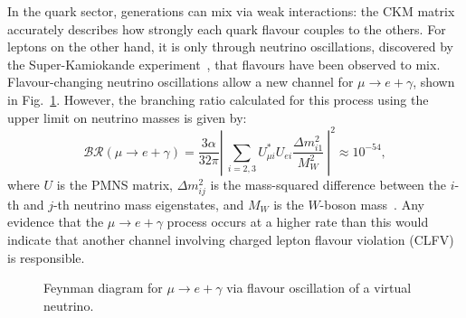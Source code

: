In the quark sector, generations can mix via weak interactions: the
CKM matrix accurately describes how strongly each quark flavour couples
to the others. %
For leptons on the other hand, it is
only through neutrino oscillations, discovered by the Super-Kamiokande
experiment~\cite{PhysRevLett.81.1562}, that flavours have been observed to mix. 
Flavour-changing neutrino oscillations allow a new channel for ${\mu \rightarrow
e + \gamma}$, shown in Fig.~\ref{fig:mu_e_nu_osc}. However, the branching ratio
calculated for this process using the upper limit on neutrino masses is given
by:
$$
\mathcal{BR}(\mu \rightarrow e + \gamma) = \frac{3\alpha}{32\pi} \left|\ \sum_{i=2, 3} U^*_{\mu i} U_{e i} 
\frac{\Delta m^2_{i1}}{M^2_W}  \ \right| ^2 \approx 10^{-54},
$$
where $U$ is the PMNS matrix, $\Delta m^2_{ij}$ is the mass-squared difference between the
$i$-th and $j$-th neutrino mass eigenstates, and $M_W$ is the $W$-boson
mass~\cite{BERNSTEIN201327}.
Any evidence that the ${\mu \rightarrow e + \gamma}$ process occurs at a higher
rate than this would indicate that another channel involving charged lepton
flavour violation (CLFV) is responsible.

\begin{figure}
    \centering
    \caption{
        Feynman diagram for $\mu \rightarrow e + \gamma$ via
        flavour oscillation of a virtual neutrino.
    }
    \label{fig:mu_e_nu_osc}
\end{figure}



